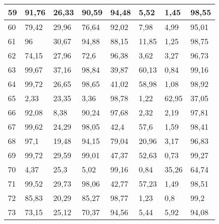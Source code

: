 \begin{longtable}[c]{|l|l|l|l|l|l|l|l|}
59              & 91,76        & 26,33        & 90,59       & 94,48         & 5,52          & 1,45          & 98,55         \\ \hline
60              & 79,42        & 29,96        & 76,64       & 92,02         & 7,98          & 4,99          & 95,01         \\ \hline
61              & 96           & 30,67        & 94,88       & 88,15         & 11,85         & 1,25          & 98,75         \\ \hline
62              & 74,15        & 27,96        & 72,6        & 96,38         & 3,62          & 3,27          & 96,73         \\ \hline
63              & 99,67        & 37,16        & 98,84       & 39,87         & 60,13         & 0,84          & 99,16         \\ \hline
64              & 99,72        & 26,65        & 98,65       & 41,02         & 58,98         & 1,08          & 98,92         \\ \hline
65              & 2,33         & 23,35        & 3,36        & 98,78         & 1,22          & 62,95         & 37,05         \\ \hline
66              & 92,08        & 8,38         & 90,24       & 97,68         & 2,32          & 2,19          & 97,81         \\ \hline
67              & 99,62        & 24,29        & 98,05       & 42,4          & 57,6          & 1,59          & 98,41         \\ \hline
68              & 97,1         & 19,48        & 94,15       & 79,04         & 20,96         & 3,17          & 96,83         \\ \hline
69              & 99,72        & 29,59        & 99,01       & 47,37         & 52,63         & 0,73          & 99,27         \\ \hline
70              & 4,37         & 25,3         & 5,02        & 99,16         & 0,84          & 35,26         & 64,74         \\ \hline
71              & 99,52        & 29,73        & 98,06       & 42,77         & 57,23         & 1,49          & 98,51         \\ \hline
72              & 85,83        & 20,29        & 85,27       & 98,77         & 1,23          & 0,8           & 99,2          \\ \hline
73              & 73,15        & 25,12        & 70,37       & 94,56         & 5,44          & 5,92          & 94,08         \\ \hline

\end{longtable}
